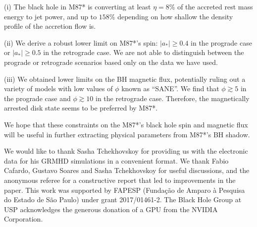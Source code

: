 \documentclass[twocolumn, linenumbers]{aastex62} %
\begin{document}
(i) The black hole in M87* is converting at least $\eta=8\%$ of the accreted rest mass energy to jet power, and up to $158\%$ depending on how shallow the density profile of the accretion flow is.

(ii) We derive a robust lower limit on M87*'s spin: $|a_*| \geq 0.4$ in the prograde case or $|a_*| \geq 0.5$ in the retrograde case. We are not able to distinguish between the prograde or retrograde scenarios based only on the data we have used.

(iii) We obtained lower limits on the BH magnetic flux, potentially ruling out a variety of models with low values of $\phi$ known as ``SANE''. We find that $\phi \gtrsim 5$ in the prograde case and $\phi \gtrsim 10$ in the retrograde case. Therefore, the magnetically arrested disk state seems to be preferred by M87*.


We hope that these constraints on the M87*'s black hole spin and magnetic flux will be useful in further extracting physical parameters from M87*'s BH shadow.




\acknowledgments

We would like to thank Sasha Tchekhovskoy for providing us with the electronic data for his GRMHD simulations in a convenient format. We thank Fabio Cafardo, Gustavo Soares and Sasha Tchekhovskoy for useful discussions, and the anonymous referee for a constructive report that led to improvements in the paper.
This work was supported by FAPESP (Funda\c{c}\~ao de Amparo \`a Pesquisa do Estado de S\~ao Paulo) under grant 2017/01461-2. The Black Hole Group at USP acknowledges the generous donation of a GPU from the NVIDIA Corporation. %

\vspace{5mm}










\end{document}
